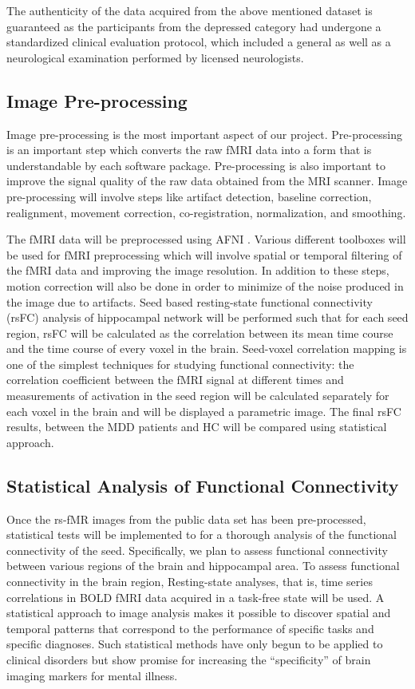 \documentclass[12pt]{article}
\begin{document}
The authenticity of the data acquired from the above mentioned dataset
is guaranteed as the participants from the depressed category had
undergone a standardized clinical evaluation protocol, which included
a general as well as a neurological examination performed by licensed
neurologists.

\newpage
\subsection{Image Pre-processing}

Image pre-processing is the most important aspect of our
project. Pre-processing is an important step which converts the raw
fMRI data into a form that is understandable by each software package.
Pre-processing is also important to improve the signal quality of the
raw data obtained from the MRI scanner. Image pre-processing will
involve steps like artifact detection, baseline correction,
realignment, movement correction, co-registration, normalization, and
smoothing.

The fMRI data will be preprocessed using AFNI \cite{coxafni}. Various
different toolboxes will be used for fMRI preprocessing which will
involve spatial or temporal filtering of the fMRI data and improving
the image resolution. In addition to these steps, motion correction
will also be done in order to minimize of the noise produced in the
image due to artifacts. Seed based resting-state functional
connectivity (rsFC) analysis of hippocampal network will be performed
such that for each seed region, rsFC will be calculated as the
correlation between its mean time course and the time course of every
voxel in the brain. Seed-voxel correlation mapping is one of the
simplest techniques for studying functional connectivity: the
correlation coefficient between the fMRI signal at different times and
measurements of activation in the seed region will be calculated
separately for each voxel in the brain and will be displayed
a parametric image. The final rsFC results, between the MDD patients
and HC will be compared using statistical approach.

\subsection{Statistical Analysis of Functional Connectivity}

\enlargethispage{\baselineskip}
\vspace{-5pt}
Once the rs-fMR images from the public data set has been
pre-processed, statistical tests will be implemented to for a thorough
analysis of the functional connectivity of the seed. Specifically, we
plan to assess functional connectivity between various regions of the
brain and hippocampal area. To assess functional connectivity in the
brain region, Resting-state analyses, that is, time series
correlations in BOLD fMRI data acquired in a task-free state will be
used. A statistical approach to image analysis makes it possible to
discover spatial and temporal patterns that correspond to the
performance of specific tasks and specific diagnoses. Such statistical
methods have only begun to be applied to clinical disorders but show
promise for increasing the ``specificity'' of brain imaging markers
for mental illness.
\end{document}
